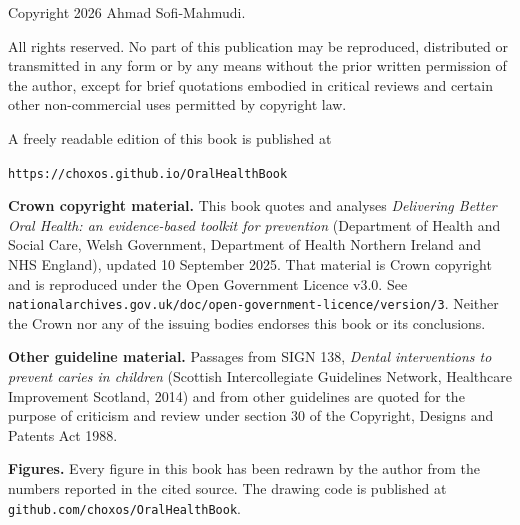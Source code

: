 
\cleardoublepage
\thispagestyle{empty}
\null\vfill
{\footnotesize\RaggedRight

\noindent Copyright \textcopyright{} 2026 Ahmad Sofi-Mahmudi.\par
\medskip

\noindent All rights reserved. No part of this publication may be reproduced,
distributed or transmitted in any form or by any means without the prior
written permission of the author, except for brief quotations embodied in
critical reviews and certain other non-commercial uses permitted by copyright
law.\par
\medskip

\noindent A freely readable edition of this book is published at\par
\noindent \texttt{https://choxos.github.io/OralHealthBook}\par
\medskip

\noindent \textbf{Crown copyright material.} This book quotes and analyses
\emph{Delivering Better Oral Health: an evidence-based toolkit for prevention}
(Department of Health and Social Care, Welsh Government, Department of Health
Northern Ireland and NHS England), updated 10 September 2025. That material is
Crown copyright and is reproduced under the Open Government Licence v3.0.
See \texttt{nationalarchives.gov.uk/doc/open-government-licence/version/3}.
Neither the Crown nor any of the issuing bodies endorses this book or its
conclusions.\par
\medskip

\noindent \textbf{Other guideline material.} Passages from SIGN 138,
\emph{Dental interventions to prevent caries in children} (Scottish
Intercollegiate Guidelines Network, Healthcare Improvement Scotland, 2014) and
from other guidelines are quoted for the purpose of criticism and review under
section 30 of the Copyright, Designs and Patents Act 1988.\par
\medskip

\noindent \textbf{Figures.} Every figure in this book has been redrawn by the
author from the numbers reported in the cited source. The drawing code is
published at \texttt{github.com/choxos/OralHealthBook}.\par
\medskip

}
